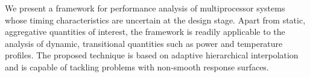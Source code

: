 We present a framework for performance analysis of multiprocessor systems whose
timing characteristics are uncertain at the design stage. Apart from static,
aggregative quantities of interest, the framework is readily applicable to the
analysis of dynamic, transitional quantities such as power and temperature
profiles. The proposed technique is based on adaptive hierarchical
interpolation and is capable of tackling problems with non-smooth response
surfaces.
